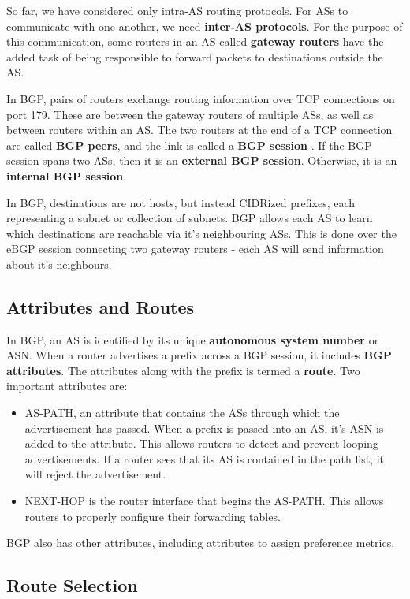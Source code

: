 \documentclass[12pt,letterpaper]{book}
\theoremstyle{definition}
\begin{document}
So far, we have considered only intra-AS routing protocols. For ASs to communicate with one another, we need \textbf{inter-AS protocols}. For the purpose of this communication, some routers in an AS called \textbf{gateway routers}  have the added task of being responsible to forward packets to destinations outside the AS.

In BGP, pairs of routers exchange routing information over TCP connections on port 179. These are between the gateway routers of multiple ASs, as well as between routers within an AS. The two routers at the end of a TCP connection are called \textbf{BGP peers}, and the link is called a \textbf{BGP session} . If the BGP session spans two ASs, then it is an \textbf{external BGP session}. Otherwise, it is an \textbf{internal BGP session}.

In BGP, destinations are not hosts, but instead CIDRized prefixes, each representing a subnet or collection of subnets. BGP allows each AS to learn which destinations are reachable via it's neighbouring ASs. This is done over the eBGP session connecting two gateway routers - each AS will send information about it's neighbours.

\subsection{Attributes and Routes}

In BGP, an AS is identified by its unique \textbf{autonomous system number} or ASN. When a router advertises a prefix across a BGP session, it includes \textbf{BGP attributes}. The attributes along with the prefix is termed a \textbf{route}. Two important attributes are:

\begin{itemize}
  \item AS-PATH, an attribute that contains the ASs through which the advertisement has passed. When a prefix is passed into an AS, it's ASN is added to the attribute. This allows routers to detect and prevent looping advertisements. If a router sees that its AS is contained in the path list, it will reject the advertisement.
  \item  NEXT-HOP is the router interface that begins the AS-PATH. This allows routers to properly configure their forwarding tables.
\end{itemize}

BGP also has other attributes, including attributes to assign preference metrics. 

\subsection{Route Selection}
\end{document}
